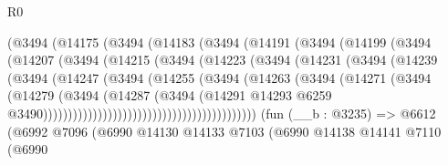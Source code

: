 \begin{lexlean}{R0}
\begin{coremodule}
                          (@3494
                            (@14175
                              (@3494
                                (@14183
                                  (@3494
                                    (@14191
                                      (@3494
                                        (@14199
                                          (@3494
                                            (@14207
                                              (@3494
                                                (@14215
                                                  (@3494
                                                    (@14223
                                                      (@3494
                                                        (@14231
                                                          (@3494
                                                            (@14239
                                                              (@3494
                                                                (@14247
                                                                  (@3494
                                                                    (@14255
                                                                      (@3494
                                                                        (@14263
                                                                          (@3494
                                                                            (@14271
                                                                              (@3494
                                                                                (@14279
                                                                                  (@3494
                                                                                    (@14287
                                                                                      (@3494
                                                                                        (@14291
                                                                                          @14293
                                                                                          @6259
                                                                                          @3490)))))))))))))))))))))))))))))))))))))))))))
    (fun (__b : @3235) =>
    @6612
      (@6992
        @7096
        (@6990
          @14130
          @14133
          @7103
          (@6990
            @14138
            @14141
            @7110
            (@6990

\end{coremodule}
\end{lexlean}
